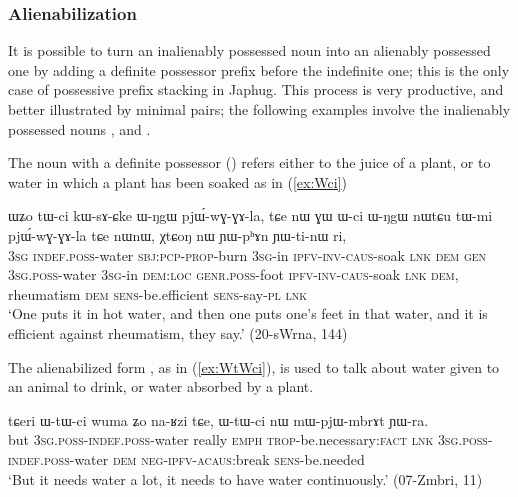 \subsubsection{Alienabilization} \label{sec:alienabilization}
 It is possible to turn an inalienably possessed noun into an  alienably possessed one by adding a definite possessor prefix before the indefinite one; this is the only case of possessive prefix stacking in Japhug. This process is very productive, and better illustrated by minimal pairs; the following examples involve the inalienably possessed nouns ,  and .
 
The noun  with a definite possessor () refers either to the juice of a plant, or to water in which a plant has been soaked as in (\ref{ex:Wci})

  \begin{exe}
\ex \label{ex:Wci}
 \gll  ɯʑo tɯ-ci kɯ-sɤ-ɕke ɯ-ŋgɯ pjɯ́-wɣ-ɣɤ-la, tɕe nɯ ɣɯ ɯ-ci ɯ-ŋgɯ nɯtɕu tɯ-mi pjɯ́-wɣ-ɣɤ-la tɕe nɯnɯ, χtɕoŋ nɯ ɲɯ-pʰɤn ɲɯ-ti-nɯ ri, \\
\textsc{3sg}  \textsc{indef}.\textsc{poss}-water \textsc{sbj}:\textsc{pcp}-\textsc{prop}-burn \textsc{3sg}-in \textsc{ipfv}-\textsc{inv}-\textsc{caus}-soak \textsc{lnk} \textsc{dem} \textsc{gen} \textsc{3sg}.\textsc{poss}-water \textsc{3sg}-in \textsc{dem}:\textsc{loc}  \textsc{genr}.\textsc{poss}-foot  \textsc{ipfv}-\textsc{inv}-\textsc{caus}-soak \textsc{lnk} \textsc{dem}, rheumatism \textsc{dem} \textsc{sens}-be.efficient \textsc{sens}-say-\textsc{pl} \textsc{lnk}  \\
 \glt `One puts it in hot water, and then one puts one's feet in that water, and it is efficient against rheumatism, they say.' (20-sWrna, 144)
 \end{exe}

The alienabilized form , as in (\ref{ex:WtWci}), is used to talk about water given to an animal to drink, or water absorbed by a plant.

 \begin{exe}
\ex \label{ex:WtWci}
 \gll  tɕeri ɯ-tɯ-ci wuma ʑo na-ʁzi tɕe, ɯ-tɯ-ci nɯ mɯ-pjɯ-mbrɤt ɲɯ-ra. \\
 but \textsc{3sg}.\textsc{poss}-\textsc{indef}.\textsc{poss}-water really \textsc{emph} \textsc{trop}-be.necessary:\textsc{fact} \textsc{lnk} \textsc{3sg}.\textsc{poss}-\textsc{indef}.\textsc{poss}-water \textsc{dem} \textsc{neg}-\textsc{ipfv}-\textsc{acaus}:break \textsc{sens}-be.needed \\
 \glt  `But it needs water a lot, it needs to have water continuously.'  (07-Zmbri, 11)
 \end{exe}
 

